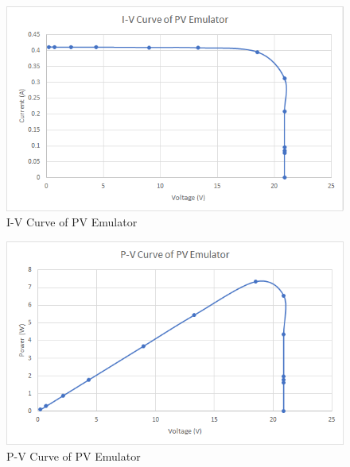 \documentclass[]{article}
\begin{document}
                    \begin{figure}[H]
                        \centering
                        \includegraphics{Lab3Results/IVCurve}
                        \caption{I-V Curve of PV Emulator}
                        \label{fig:Lab3IV}
                    \end{figure}
                    \begin{figure}[H]
                        \centering
                        \includegraphics{Lab3Results/PVCurve}
                        \caption{P-V Curve of PV Emulator}
                        \label{fig:Lab3PV}
                    \end{figure}
\end{document}
